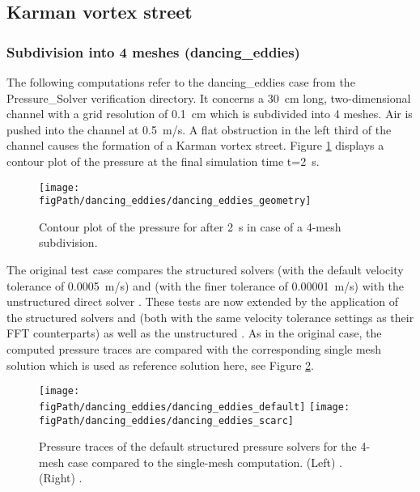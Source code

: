 \newpage
\subsection{Karman vortex street}
\label{SEC_SCARC_dancing_eddies}

\subsubsection{Subdivision into 4 meshes ({\ct dancing\_eddies})}
The following computations refer to the {\ct dancing\_eddies} case from the Pressure\_Solver verification directory. It concerns a 30~cm long, two-dimensional channel with a grid resolution of 0.1~cm which is subdivided into 4 meshes. Air is pushed into the channel at 0.5~m/s. A flat obstruction in the left third of the channel causes the formation of a Karman vortex street. Figure \ref{FIG_scarc_dancing_eddies_four} displays a contour plot of the pressure at the final simulation time t=2~s.
\begin{figure}[ht]
\begin{center}
\texttt{[image: \\figPath/dancing\_eddies/dancing\_eddies\_geometry]}
\end{center}
\caption[Contour plot for the 4-mesh {} case]{Contour plot of the pressure for \uscarc{} after 2~s in case of a 4-mesh subdivision.}
\label{FIG_scarc_dancing_eddies_four}
\end{figure}

The original test case compares the structured solvers \fftdefault{} (with the default velocity tolerance of 0.0005~m/s) and \ffttight{} (with the finer tolerance of 0.00001~m/s) with the unstructured direct solver \uglmat{}. These tests are now extended by the application of the structured solvers \scarcdefault{} and \scarctight{} (both with the same velocity tolerance settings as their FFT counterparts) as well as the unstructured \uscarc{}. 
As in the original case, the computed pressure traces are compared with the corresponding single mesh solution which is used as reference solution here, see Figure \ref{FIG_scarc_dancing_eddies_pressure}.

\begin{figure}[ht]
\begin{center}
\texttt{[image: \\figPath/dancing\_eddies/dancing\_eddies\_default]}
\texttt{[image: \\figPath/dancing\_eddies/dancing\_eddies\_scarc]}
\end{center}
\caption[Results of the {} test cases]{Pressure traces of the default structured pressure solvers for the 4-mesh {} case compared to the single-mesh computation. (Left) \fftdefault{}. (Right) \scarcdefault{}.}
\label{FIG_scarc_dancing_eddies_pressure}
\end{figure}

